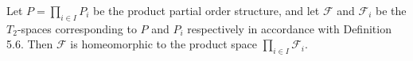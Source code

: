 Let $P = \prod_{i \in I} P_i$ be the product partial order structure, and let $\mathcal{F}$ and $\mathcal{F}_i$ be the $T_2$-spaces corresponding to $P$ and $P_i$ respectively in accordance with Definition 5.6. Then $\mathcal{F}$ is homeomorphic to the product space $\prod_{i \in I} \mathcal{F}_i$.

